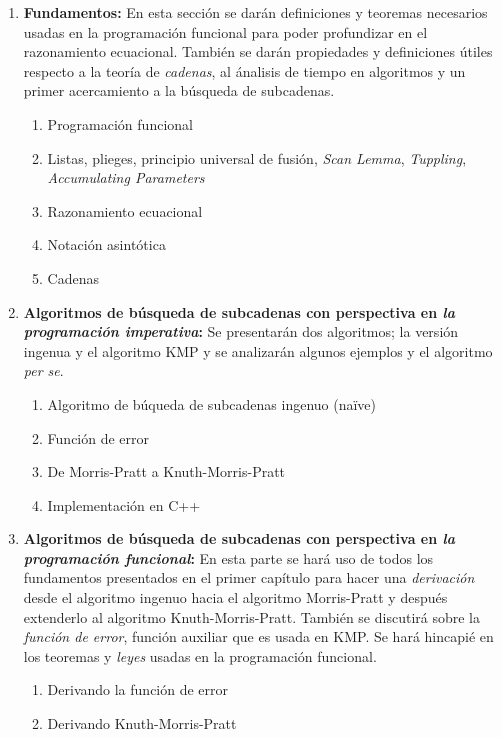 \documentclass[letterpaper,11pt]{article}
\begin{document}
\begin{enumerate}

\item \textbf{Fundamentos:} En esta sección se darán definiciones y teoremas necesarios usadas en
la programación funcional para poder profundizar en el razonamiento ecuacional. También se darán
propiedades y definiciones útiles respecto a la teoría de \textit{cadenas}, 
al ánalisis de tiempo en algoritmos y un primer acercamiento a la búsqueda de subcadenas.
\begin{enumerate}
    \item Programación funcional
    \item Listas, plieges, principio universal de fusión, \textit{Scan Lemma}, \textit{Tuppling},
    \textit{Accumulating Parameters}
    \item Razonamiento ecuacional
    \item Notación asintótica
    \item Cadenas
\end{enumerate}

\item \textbf{Algoritmos de búsqueda de subcadenas con perspectiva en \textit{la programación
imperativa}:} Se presentarán dos algoritmos; la versión ingenua y el algoritmo KMP y se analizarán
algunos ejemplos y el algoritmo \textit{per se}.
\begin{enumerate}
    \item Algoritmo de búqueda de subcadenas ingenuo (naïve)
    \item Función de error
    \item De Morris-Pratt a Knuth-Morris-Pratt
    \item Implementación en \textsc{C++}
\end{enumerate}

\item \textbf{Algoritmos de búsqueda de subcadenas con perspectiva en \textit{la programación
funcional}:} En esta parte se hará uso de todos los fundamentos presentados en el primer capítulo
para hacer una \textit{derivación} desde el algoritmo ingenuo hacia el algoritmo Morris-Pratt y 
después extenderlo al algoritmo Knuth-Morris-Pratt. 
También se discutirá sobre la \textit{función de error}, función auxiliar que es usada en KMP. 
Se hará hincapié en los teoremas y \textit{leyes} usadas en la programación funcional.
\begin{enumerate}
    \item Derivando la función de error
    \item Derivando Knuth-Morris-Pratt
\end{enumerate}


\end{enumerate}
\end{document}
